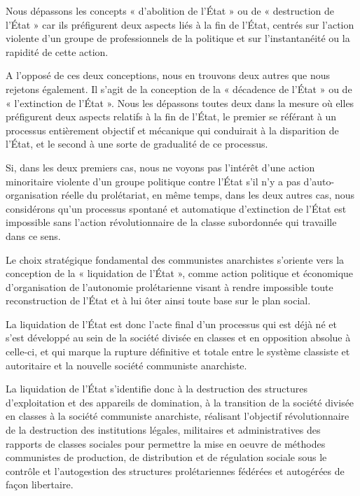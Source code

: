Nous dépassons les concepts « d'abolition de l'État » ou de « destruction de l'État » car ils préfigurent deux aspects liés à la fin de l'État, centrés sur l'action violente d'un groupe de professionnels de la politique et sur l'instantanéité ou la rapidité de cette action.

A l'opposé de ces deux conceptions, nous en trouvons deux autres que nous rejetons également. Il s'agit de la conception de la « décadence de l'État » ou de « l'extinction de l'État ». Nous les dépassons toutes deux dans la mesure où elles préfigurent deux aspects relatifs à la fin de l'État, le premier se référant à un processus entièrement objectif et mécanique qui conduirait à la disparition de l'État, et le second à une sorte de gradualité de ce processus.

Si, dans les deux premiers cas, nous ne voyons pas l'intérêt d'une action minoritaire violente d'un groupe politique contre l'État s'il n'y a pas d'auto-organisation réelle du prolétariat, en même temps, dans les deux autres cas, nous considérons qu'un processus spontané et automatique d'extinction de l'État est impossible sans l'action révolutionnaire de la classe subordonnée qui travaille dans ce sens.

Le choix stratégique fondamental des communistes anarchistes s'oriente vers la conception de la « liquidation de l'État », comme action politique et économique d'organisation de l'autonomie prolétarienne visant à rendre impossible toute reconstruction de l'État et à lui ôter ainsi toute base sur le plan social.

La liquidation de l'État est donc l'acte final d'un processus qui est déjà né et s'est développé au sein de la société divisée en classes et en opposition absolue à celle-ci, et qui marque la rupture définitive et totale entre le système classiste et autoritaire et la nouvelle société communiste anarchiste.

La liquidation de l'État s'identifie donc à la destruction des structures d'exploitation et des appareils de domination, à la transition de la société divisée en classes à la société communiste anarchiste, réalisant l'objectif révolutionnaire de la destruction des institutions légales, militaires et administratives des rapports de classes sociales pour permettre la mise en oeuvre de méthodes communistes de production, de distribution et de régulation sociale sous le contrôle et l'autogestion des structures prolétariennes fédérées et autogérées de façon libertaire.

